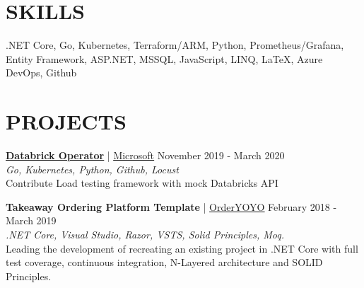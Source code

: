 \documentclass[margin, 10pt, hidelinks]{res} %
\newcommand{\tab}{\hspace*{1em}} %
\newcommand{\emphasize}{\bf} %
\begin{document}
\begin{resume}
    \section{SKILLS}

    .NET Core, Go, Kubernetes, Terraform/ARM, Python, Prometheus/Grafana, Entity Framework, ASP.NET, MSSQL, JavaScript, LINQ, LaTeX,
    Azure DevOps, Github

    \section{PROJECTS}

    \href{https://github.com/microsoft/azure-databricks-operator/pull/173}{\emphasize\underline{Databrick Operator}} | \href{https://www.microsoft.com/}{\underline{Microsoft}} \hfill November 2019  - March 2020 \\
    {\it Go, Kubernetes, Python, Github, Locust} \\
    \tab Contribute Load testing framework with mock Databricks API


        {\emphasize Takeaway Ordering Platform Template} | \href{https://orderyoyo.com/}{\underline{OrderYOYO}} \hfill February 2018  - March 2019 \\
    {\it .NET Core, Visual Studio, Razor, VSTS, Solid Principles, Moq.} \\
    \tab Leading the development of recreating an existing project in .NET Core with full test coverage, continuous integration, N-Layered architecture and SOLID Principles.



\end{resume}
\end{document}
